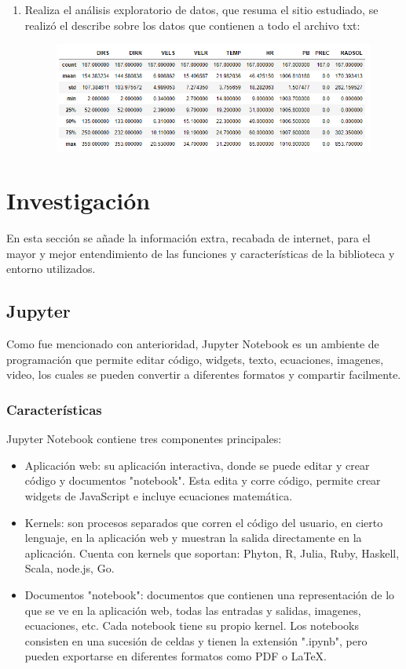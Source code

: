 \documentclass[a4paper]{article}
\begin{document}
\begin{enumerate}
\item Realiza el análisis exploratorio de datos, que resuma el sitio estudiado, se realizó el describe sobre los datos que contienen a todo el archivo txt: 

\begin{figure}[h!]
  \includegraphics[width=14cm]{7.png}
  \centering
  \label{fig:7}
\end{figure}

\end{enumerate}


\section {Investigación}
En esta sección se añade la información extra, recabada de internet, para el mayor y mejor entendimiento de las funciones y características de la biblioteca y entorno utilizados. 


\subsection{Jupyter}

Como fue mencionado con anterioridad, Jupyter Notebook es un ambiente de programación que permite editar código, widgets, texto, ecuaciones, imagenes, video, los cuales se pueden convertir a diferentes formatos y compartir facilmente. 

\subsubsection{Características}
Jupyter Notebook contiene tres componentes principales: 
\begin{itemize}
\item Aplicación web: su aplicación interactiva, donde se puede editar y crear código y documentos "notebook". Esta edita y corre código, permite crear widgets de JavaScript e incluye ecuaciones matemática.
\item Kernels: son procesos separados que corren el código del usuario, en cierto lenguaje, en la aplicación web y muestran la salida directamente en la aplicación. Cuenta con kernels que soportan: Phyton, R, Julia, Ruby, Haskell, Scala, node.js, Go.
\item Documentos "notebook": documentos que contienen una representación de lo que se ve en la aplicación web, todas las entradas y salidas, imagenes, ecuaciones, etc. Cada notebook tiene su propio kernel. Los notebooks consisten en una sucesión de celdas y tienen la extensión ".ipynb", pero pueden exportarse en diferentes formatos como PDF o LaTeX.
\end{itemize}
\end{document}
